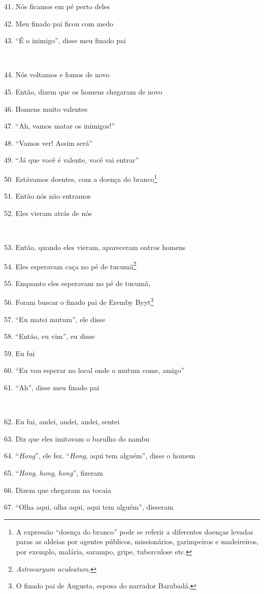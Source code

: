 41. Nós ficamos em pé perto deles

42. Meu finado pai ficou com medo

43. ``É o inimigo'', disse meu finado pai

~

44. Nós voltamos e fomos de novo

45. Então, dizem que os homens chegaram de novo

46. Homens muito valentes

47. ``Ah, vamos matar os inimigos!''

48. ``Vamos ver! Assim será''

49. ``Já que você é valente, você vai entrar''

50. Estávamos doentes, com a doença do branco\footnote{A expressão
  ``doença do branco'' pode se referir a diferentes doenças levadas
  paras as aldeias por agentes públicos, missionários, garimpeiros e
  madeireiros, por exemplo, malária, sarampo, gripe, tuberculose etc.}

51. Então nós não entramos

52. Eles vieram atrás de nós

~

53. Então, quando eles vieram, apareceram outros homens

54. Eles esperavam caça no pé de tucumã\footnote{\emph{Astrocaryum
  aculeatum}.}

55. Enquanto eles esperavam no pé de tucumã,

56. Foram buscar o finado pai de Eremby Byyt\footnote{O finado pai de
  Augusta, esposa do narrador Barabadá.}

57. ``Eu matei mutum'', ele disse

58. ``Então, eu vim'', eu disse

59. Eu fui

60. ``Eu vou esperar no local onde o mutum come, amigo''

61. ``Ah'', disse meu finado pai

~

62. Eu fui, andei, andei, andei, sentei

63. Diz que eles imitavam o barulho do nambu

64. ``\emph{Hong}'', ele fez. ``\emph{Hong}, aqui tem alguém'', disse o homem

65. ``\emph{Hong}, \emph{hong}, \emph{hong}'', fizeram

66. Dizem que chegaram na tocaia

67. ``Olha aqui, olha aqui, aqui tem alguém'', disseram

